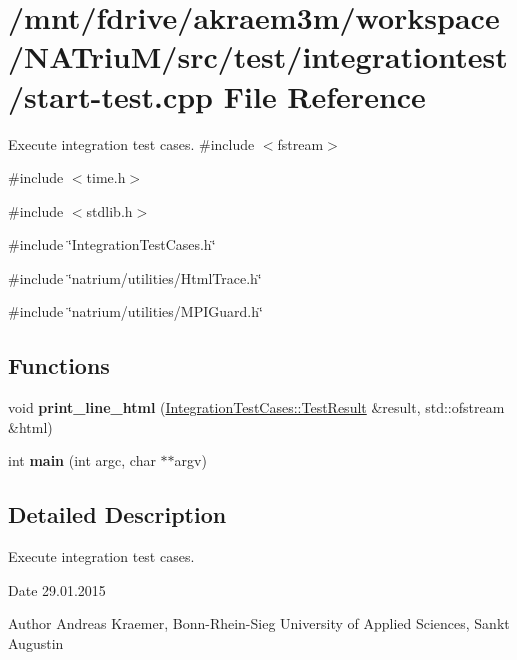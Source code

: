 \hypertarget{start-test_8cpp}{
\section{/mnt/fdrive/akraem3m/workspace/NATriuM/src/test/integrationtest/start-\/test.cpp File Reference}
\label{start-test_8cpp}
}


Execute integration test cases.  
{\ttfamily \#include $<$fstream$>$}\par
{\ttfamily \#include $<$time.h$>$}\par
{\ttfamily \#include $<$stdlib.h$>$}\par
{\ttfamily \#include \char`\"{}IntegrationTestCases.h\char`\"{}}\par
{\ttfamily \#include \char`\"{}natrium/utilities/HtmlTrace.h\char`\"{}}\par
{\ttfamily \#include \char`\"{}natrium/utilities/MPIGuard.h\char`\"{}}\par
\subsection*{Functions}
\begin{DoxyCompactItemize}
\item 
\hypertarget{start-test_8cpp_a363deb579434784ee372fb2d37def478}{
void {\bfseries print\_\-line\_\-html} (\hyperlink{structnatrium_1_1IntegrationTestCases_1_1TestResult}{IntegrationTestCases::TestResult} \&result, std::ofstream \&html)}
\label{start-test_8cpp_a363deb579434784ee372fb2d37def478}

\item 
\hypertarget{start-test_8cpp_a3c04138a5bfe5d72780bb7e82a18e627}{
int {\bfseries main} (int argc, char $\ast$$\ast$argv)}
\label{start-test_8cpp_a3c04138a5bfe5d72780bb7e82a18e627}

\end{DoxyCompactItemize}


\subsection{Detailed Description}
Execute integration test cases. \begin{DoxyDate}{Date}
29.01.2015 
\end{DoxyDate}
\begin{DoxyAuthor}{Author}
Andreas Kraemer, Bonn-\/Rhein-\/Sieg University of Applied Sciences, Sankt Augustin 
\end{DoxyAuthor}
